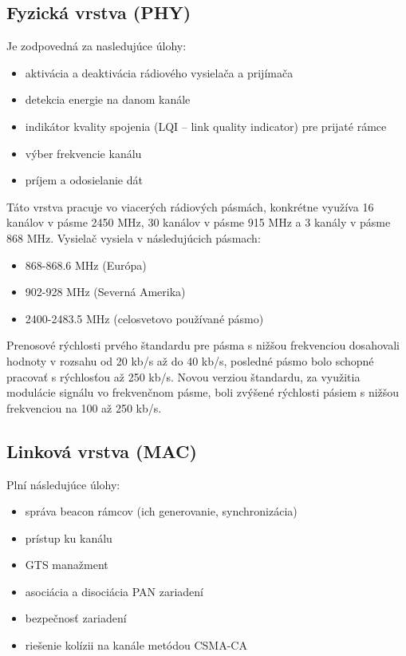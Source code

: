 \documentclass[11pt,twoside,a4paper]{book}
\begin{document}
\subsection{Fyzická vrstva (PHY)}
Je zodpovedná za nasledujúce úlohy:
\begin{itemize}
\item aktivácia a deaktivácia rádiového vysielača a prijímača
\item detekcia energie na danom kanále
\item indikátor kvality spojenia (LQI – link quality indicator) pre prijaté rámce
\item výber frekvencie kanálu
\item príjem a odosielanie dát
\end{itemize}

Táto vrstva pracuje vo viacerých rádiových pásmách, konkrétne využíva 16 kanálov v pásme 2450 MHz, 30 kanálov v pásme 915 MHz a 3 kanály v pásme 868 MHz. Vysielač vysiela v následujúcich pásmach:
\begin{itemize}
\item 868-868.6 MHz (Európa)
\item 902-928 MHz (Severná Amerika)
\item 2400-2483.5 MHz (celosvetovo používané pásmo)
\end{itemize}

Prenosové rýchlosti prvého štandardu pre pásma s nižšou frekvenciou dosahovali hodnoty v rozsahu od 20 kb/s až do 40 kb/s, posledné pásmo bolo schopné pracovať s rýchlosťou až 250 kb/s. Novou verziou štandardu, za využitia modulácie signálu vo frekvenčnom pásme, boli zvýšené rýchlosti pásiem s nižšou frekvenciou na 100 až 250 kb/s.

\subsection{Linková vrstva (MAC)}
Plní následujúce úlohy:
\begin{itemize}
\item správa beacon rámcov (ich generovanie, synchronizácia)
\item prístup ku kanálu
\item GTS manažment
\item asociácia a disociácia PAN zariadení
\item bezpečnosť zariadení
\item riešenie kolízii na kanále metódou CSMA-CA
\end{itemize}
\end{document}
